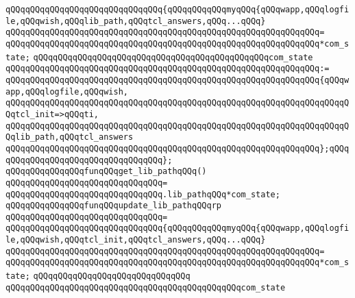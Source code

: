 \verb|qQQqqQQqqQQqqQQqqQQqqQQqqQQqqQQq{qQQqqQQqqQQqmyqQQq{qQQqwapp,qQQqlogfile,qQQqwish,qQQqlib_path,qQQqtcl_answers,qQQq...qQQq}|\newline
\verb|qQQqqQQqqQQqqQQqqQQqqQQqqQQqqQQqqQQqqQQqqQQqqQQqqQQqqQQqqQQqqQQq=|\newline
\verb|qQQqqQQqqQQqqQQqqQQqqQQqqQQqqQQqqQQqqQQqqQQqqQQqqQQqqQQqqQQqqQQq*com_state;|\newline
\newline
\verb|qQQqqQQqqQQqqQQqqQQqqQQqqQQqqQQqqQQqqQQqqQQqqQQqcom_state|\newline
\verb|qQQqqQQqqQQqqQQqqQQqqQQqqQQqqQQqqQQqqQQqqQQqqQQqqQQqqQQqqQQqqQQq:=|\newline
\verb|qQQqqQQqqQQqqQQqqQQqqQQqqQQqqQQqqQQqqQQqqQQqqQQqqQQqqQQqqQQqqQQq{qQQqwapp,qQQqlogfile,qQQqwish,|\newline
\verb|qQQqqQQqqQQqqQQqqQQqqQQqqQQqqQQqqQQqqQQqqQQqqQQqqQQqqQQqqQQqqQQqqQQqqQQqtcl_init=>qQQqti,|\newline
\verb|qQQqqQQqqQQqqQQqqQQqqQQqqQQqqQQqqQQqqQQqqQQqqQQqqQQqqQQqqQQqqQQqqQQqqQQqlib_path,qQQqtcl_answers|\newline
\verb|qQQqqQQqqQQqqQQqqQQqqQQqqQQqqQQqqQQqqQQqqQQqqQQqqQQqqQQqqQQqqQQq};qQQq|\newline
\verb|qQQqqQQqqQQqqQQqqQQqqQQqqQQqqQQq};|\newline
\newline
\newline
\verb|qQQqqQQqqQQqqQQqfunqQQqget_lib_pathqQQq()|\newline
\verb|qQQqqQQqqQQqqQQqqQQqqQQqqQQqqQQq=|\newline
\verb|qQQqqQQqqQQqqQQqqQQqqQQqqQQqqQQq.lib_pathqQQq*com_state;|\newline
\newline
\verb|qQQqqQQqqQQqqQQqfunqQQqupdate_lib_pathqQQqrp|\newline
\verb|qQQqqQQqqQQqqQQqqQQqqQQqqQQqqQQq=|\newline
\verb|qQQqqQQqqQQqqQQqqQQqqQQqqQQqqQQq{qQQqqQQqqQQqmyqQQq{qQQqwapp,qQQqlogfile,qQQqwish,qQQqtcl_init,qQQqtcl_answers,qQQq...qQQq}|\newline
\verb|qQQqqQQqqQQqqQQqqQQqqQQqqQQqqQQqqQQqqQQqqQQqqQQqqQQqqQQqqQQqqQQq=|\newline
\verb|qQQqqQQqqQQqqQQqqQQqqQQqqQQqqQQqqQQqqQQqqQQqqQQqqQQqqQQqqQQqqQQq*com_state;|\newline
\verb|qQQqqQQqqQQqqQQqqQQqqQQqqQQqqQQq|\newline
\verb|qQQqqQQqqQQqqQQqqQQqqQQqqQQqqQQqqQQqqQQqqQQqqQQqcom_state|\newline
